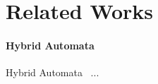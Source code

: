 \section{Related Works}

\paragraph{Hybrid Automata}
Hybrid Automata~\cite{DBLP:conf/lics/Henzinger96} ...

